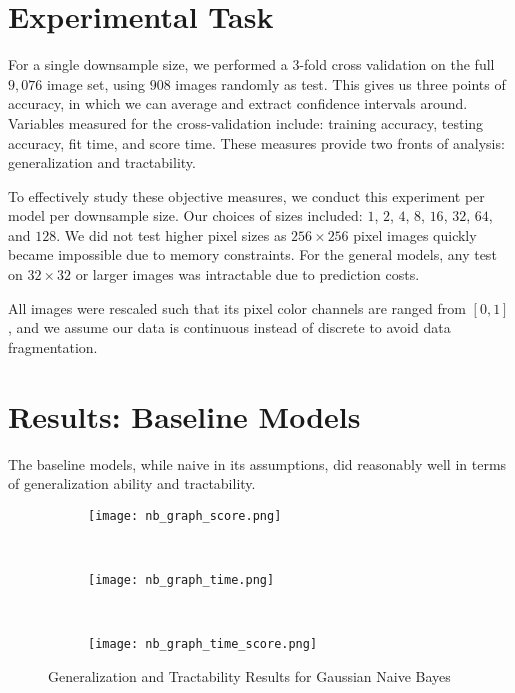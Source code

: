 \documentclass{article}
\begin{document}



\section{Experimental Task}
\label{sec:task}
For a single downsample size, we performed a $3$-fold cross validation on
the full $9,076$ image set, using $908$
images randomly as test. This gives us three points of accuracy, in which we
can average and extract confidence intervals around. Variables measured for the
cross-validation include: training accuracy, testing accuracy, fit time, and
score time. These measures provide two fronts of analysis: generalization and
tractability.

To effectively study these objective measures, we conduct this experiment
per model per downsample size. Our choices of sizes
included: $1$, $2$, $4$, $8$, $16$, $32$, $64$, and $128$. We did not test higher pixel sizes
as $256 \times 256$ pixel images quickly became impossible due to memory constraints.
For the general models, any test on $32 \times 32$ or larger images was intractable
due to prediction costs.

All images were rescaled such that its pixel color channels are ranged from
$[0, 1]$, and we assume our data is continuous instead of discrete to avoid data
fragmentation.


\section{Results: Baseline Models}

\label{sec:results-baseline}
The baseline models, while naive in its assumptions, did reasonably well in
terms of generalization ability and tractability.


\begin{figure}
  \centering
  \begin{subfigure}[b]{0.3\textwidth}
    \centering
    \texttt{[image: nb\_graph\_score.png]}
    \caption*{}
    \label{fig:nb_graph_score}
  \end{subfigure}
  ~
  \begin{subfigure}[b]{0.3\textwidth}
    \centering
    \texttt{[image: nb\_graph\_time.png]}
    \caption*{}
    \label{fig:nb_graph_time}
  \end{subfigure}
  ~
  \begin{subfigure}[b]{0.3\textwidth}
    \centering
    \texttt{[image: nb\_graph\_time\_score.png]}
    \caption*{}
    \label{fig:nb_graph_time_score}
  \end{subfigure}
  \vspace{-10pt}
  \caption{Generalization and Tractability Results for Gaussian Naive Bayes}
  \label{fig:GNB}
\end{figure}
\end{document}
